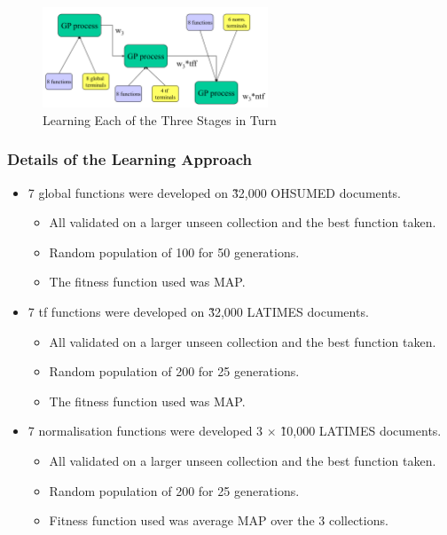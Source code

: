\documentclass[a4paper,11pt]{article}
\begin{document}
\begin{figure}[H]
    \centering
    \includegraphics[width=0.6\textwidth]{./images/threestages.png}
    \caption{Learning Each of the Three Stages in Turn}
\end{figure}

\subsubsection{Details of the Learning Approach}
\begin{itemize}
    \item   7 global functions were developed on \~32,000 OHSUMED documents.
            \begin{itemize}
                \item   All validated on a larger unseen collection and the best function taken.
                \item   Random population of 100 for 50 generations.
                \item   The fitness function used was MAP.
            \end{itemize}

    \item   7 tf functions were developed on \~32,000 LATIMES documents.
            \begin{itemize}
                \item   All validated on a larger unseen collection and the best function taken.
                \item   Random population of 200 for 25 generations.
                \item   The fitness function used was MAP.
            \end{itemize}

    \item   7 normalisation functions were developed 3 $\times$ \~ 10,000 LATIMES documents.
            \begin{itemize}
                \item   All validated on a larger unseen collection and the best function taken.
                \item   Random population of 200 for 25 generations.
                \item   Fitness function used was average MAP over the 3 collections.
            \end{itemize}
\end{itemize}
\end{document}

